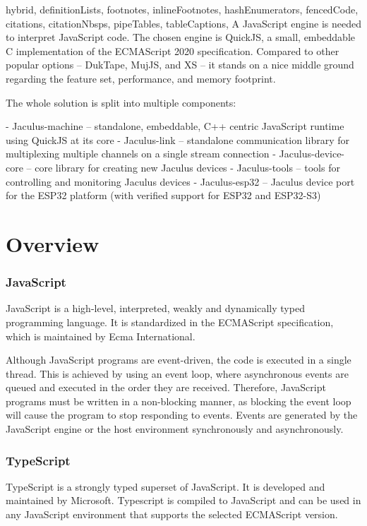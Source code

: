 \documentclass[
  digital,
  oneside,
  nosansbold,
  nocolorbold,
  lof,
  lot
]{fithesis4}
\begin{document}
\begin{markdown*}{%
  hybrid,
  definitionLists,
  footnotes,
  inlineFootnotes,
  hashEnumerators,
  fencedCode,
  citations,
  citationNbsps,
  pipeTables,
  tableCaptions,
}
A JavaScript engine is needed to interpret JavaScript code. The chosen engine is QuickJS, a small, embeddable C implementation of the ECMAScript 2020 specification. Compared to other popular options -- DukTape, MujJS, and XS -- it stands on a nice middle ground regarding the feature set, performance, and memory footprint.

The whole solution is split into multiple components:

  - Jaculus-machine -- standalone, embeddable, C++ centric JavaScript runtime using QuickJS at its core
  - Jaculus-link -- standalone communication library for multiplexing multiple channels on a single stream connection
  - Jaculus-device-core -- core library for creating new Jaculus devices
  - Jaculus-tools -- tools for controlling and monitoring Jaculus devices
  - Jaculus-esp32 -- Jaculus device port for the ESP32 platform (with verified support for ESP32 and ESP32-S3)


\chapter{Overview}

\subsection{JavaScript}

JavaScript is a high-level, interpreted, weakly and dynamically typed programming language. It is standardized in the ECMAScript specification, which is maintained by Ecma International.

Although JavaScript programs are event-driven, the code is executed in a single thread. This is achieved by using an event loop, where asynchronous events are queued and executed in the order they are received. Therefore, JavaScript programs must be written in a non-blocking manner, as blocking the event loop will cause the program to stop responding to events. Events are generated by the JavaScript engine or the host environment synchronously and asynchronously.


\subsection{TypeScript}

TypeScript is a strongly typed superset of JavaScript. It is developed and maintained by Microsoft. Typescript is compiled to JavaScript and can be used in any JavaScript environment that supports the selected ECMAScript version.



\end{markdown*}
\end{document}
